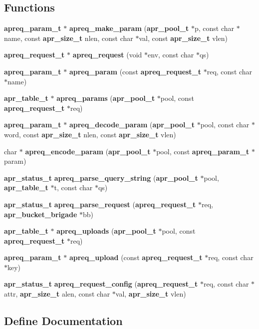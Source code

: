 \subsection*{Functions}
\begin{CompactItemize}
\item 
{\bf apreq\_\-param\_\-t} $\ast$ {\bf apreq\_\-make\_\-param} ({\bf apr\_\-pool\_\-t} $\ast$p, const char $\ast$name, const {\bf apr\_\-size\_\-t} nlen, const char $\ast$val, const {\bf apr\_\-size\_\-t} vlen)
\item 
{\bf apreq\_\-request\_\-t} $\ast$ {\bf apreq\_\-request} (void $\ast$env, const char $\ast$qs)
\item 
{\bf apreq\_\-param\_\-t} $\ast$ {\bf apreq\_\-param} (const {\bf apreq\_\-request\_\-t} $\ast$req, const char $\ast$name)
\item 
{\bf apr\_\-table\_\-t} $\ast$ {\bf apreq\_\-params} ({\bf apr\_\-pool\_\-t} $\ast$pool, const {\bf apreq\_\-request\_\-t} $\ast$req)
\item 
{\bf apreq\_\-param\_\-t} $\ast$ {\bf apreq\_\-decode\_\-param} ({\bf apr\_\-pool\_\-t} $\ast$pool, const char $\ast$word, const {\bf apr\_\-size\_\-t} nlen, const {\bf apr\_\-size\_\-t} vlen)
\item 
char $\ast$ {\bf apreq\_\-encode\_\-param} ({\bf apr\_\-pool\_\-t} $\ast$pool, const {\bf apreq\_\-param\_\-t} $\ast$param)
\item 
{\bf apr\_\-status\_\-t} {\bf apreq\_\-parse\_\-query\_\-string} ({\bf apr\_\-pool\_\-t} $\ast$pool, {\bf apr\_\-table\_\-t} $\ast$t, const char $\ast$qs)
\item 
{\bf apr\_\-status\_\-t} {\bf apreq\_\-parse\_\-request} ({\bf apreq\_\-request\_\-t} $\ast$req, {\bf apr\_\-bucket\_\-brigade} $\ast$bb)
\item 
{\bf apr\_\-table\_\-t} $\ast$ {\bf apreq\_\-uploads} ({\bf apr\_\-pool\_\-t} $\ast$pool, const {\bf apreq\_\-request\_\-t} $\ast$req)
\item 
{\bf apreq\_\-param\_\-t} $\ast$ {\bf apreq\_\-upload} (const {\bf apreq\_\-request\_\-t} $\ast$req, const char $\ast$key)
\item 
{\bf apr\_\-status\_\-t} {\bf apreq\_\-request\_\-config} ({\bf apreq\_\-request\_\-t} $\ast$req, const char $\ast$attr, {\bf apr\_\-size\_\-t} alen, const char $\ast$val, {\bf apr\_\-size\_\-t} vlen)\label{group__params_a12}

\end{CompactItemize}


\subsection{Define Documentation}
